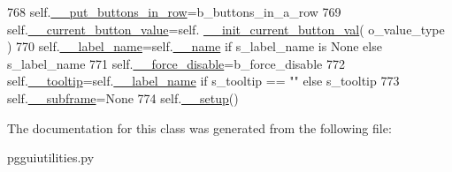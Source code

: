 \begin{DoxyCode}
768         self.\hyperlink{classnegui_1_1pgguiutilities_1_1KeyCategoricalValueFrame_a869087c9cc908de0226eec78cb4282bb}{\_\_put\_buttons\_in\_row}=b\_buttons\_in\_a\_row
769         self.\hyperlink{classnegui_1_1pgguiutilities_1_1KeyCategoricalValueFrame_aa1bb987386f2e559c6de976b745f185e}{\_\_current\_button\_value}=self.
      \hyperlink{classnegui_1_1pgguiutilities_1_1KeyCategoricalValueFrame_ab1e309b3e63c5c4a57d37d2a61f4e90d}{\_\_init\_current\_button\_val}( o\_value\_type )
770         self.\hyperlink{classnegui_1_1pgguiutilities_1_1KeyCategoricalValueFrame_a3a453ac47871c2f8b894442fd3ef5d07}{\_\_label\_name}=self.\hyperlink{classnegui_1_1pgguiutilities_1_1KeyCategoricalValueFrame_a92a1947d6110ada3bd813cc8e84d84ad}{\_\_name} \textcolor{keywordflow}{if} s\_label\_name \textcolor{keywordflow}{is} \textcolor{keywordtype}{None} \textcolor{keywordflow}{else} s\_label\_name
771         self.\hyperlink{classnegui_1_1pgguiutilities_1_1KeyCategoricalValueFrame_a01ea2795b9136b4fab5d6fe78dc2947d}{\_\_force\_disable}=b\_force\_disable
772         self.\hyperlink{classnegui_1_1pgguiutilities_1_1KeyCategoricalValueFrame_ae2f1424ab33f1ff0c9477dcf401748ca}{\_\_tooltip}=self.\hyperlink{classnegui_1_1pgguiutilities_1_1KeyCategoricalValueFrame_a3a453ac47871c2f8b894442fd3ef5d07}{\_\_label\_name} \textcolor{keywordflow}{if} s\_tooltip == \textcolor{stringliteral}{""} \textcolor{keywordflow}{else} s\_tooltip
773         self.\hyperlink{classnegui_1_1pgguiutilities_1_1KeyCategoricalValueFrame_ad2350dd7438d98d077c86e8295425ca0}{\_\_subframe}=\textcolor{keywordtype}{None}
774         self.\hyperlink{classnegui_1_1pgguiutilities_1_1KeyCategoricalValueFrame_a1e890256208ab06e21db468c7aed6bd8}{\_\_setup}()
\end{DoxyCode}


The documentation for this class was generated from the following file\+:\begin{DoxyCompactItemize}
\item 
pgguiutilities.\+py\end{DoxyCompactItemize}
